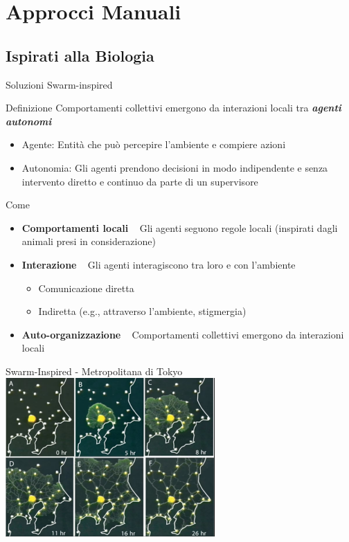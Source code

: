 \documentclass[presentation, 10pt,aspectratio=169]{beamer}\mode<presentation>{\usetheme{AMSBolognaFC}}
\begin{document}
\section{Approcci Manuali}


\subsection{Ispirati alla Biologia}

\begin{frame}{Soluzioni Swarm-inspired}
	\begin{exampleblock}{Definizione}
		Comportamenti collettivi \alert{emergono} da interazioni locali tra \emph{\textbf{agenti autonomi}}
		\begin{itemize}
			\item Agente: Entità che può percepire l'ambiente e compiere azioni
			\item Autonomia: Gli agenti prendono decisioni in modo indipendente e senza intervento diretto e continuo da parte di un supervisore
		\end{itemize}
	\end{exampleblock}
	\begin{block}{Come}
		\begin{itemize}
			\item \textbf{Comportamenti locali} \faArrowRight ~ Gli agenti seguono regole locali (inspirati dagli animali presi in considerazione)
			\item \textbf{Interazione} \faArrowRight ~ Gli agenti interagiscono tra loro e con l'ambiente
			\begin{itemize}
				\item Comunicazione diretta 
				\item Indiretta (e.g., attraverso l'ambiente, stigmergia)
			\end{itemize}
			\item \textbf{Auto-organizzazione} \faArrowRight ~ Comportamenti collettivi emergono da interazioni locali
		\end{itemize}
	\end{block}
\end{frame}
\begin{frame}{Swarm-Inspired - Metropolitana di Tokyo}
	\centering
	\href{https://www.youtube.com/shorts/GwKuFREOgmo}{\includegraphics[width=0.6\textwidth]{img/metro-tokyo.png}}
\end{frame}
\end{document}

